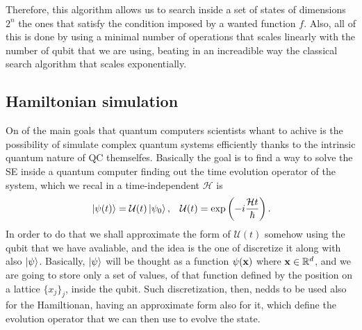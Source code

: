 \noindent
Therefore, this algorithm allows us to search inside a set of states of dimensions $2^n$ the ones that satisfy the condition imposed by a wanted function $f$. Also, all of this is done by using a minimal number of operations that scales linearly with the number of qubit that we are using, beating in an increadible way the classical search algorithm that scales exponentially.

\subsection{Hamiltonian simulation}

On of the main goals that quantum computers scientists whant to achive is the possibility of simulate complex quantum systems efficiently thanks to the intrinsic quantum nature of QC themselfes. Basically the goal is to find a way to solve the SE inside a quantum computer finding out the time evolution operator of the system, which we recal in a time-independent $\mathcal{H}$ is
\begin{align}
    &\ket{\psi(t)} = \mathcal{U}(t)\ket{\psi_0}, &\mathcal{U}(t) = \exp\left( -i \frac{\mathcal{H}t}{\hbar} \right).
\end{align}
In order to do that we shall approximate the form of $\mathcal{U}(t)$ somehow using the qubit that we have avaliable, and the idea is the one of discretize it along with also $\ket{\psi}$. Basically, $\ket{\psi}$ will be thought as a function $\psi(\vb{x})$ where $\vb{x}\in\mathbb{R}^d$, and we are going to store only a set of values, of that function defined by the position on a lattice $\{x_j\}_j$, inside the qubit. Such discretization, then, nedds to be used also for the Hamiltionan, having an approximate form also for it, which define the evolution operator that we can then use to evolve the state.

